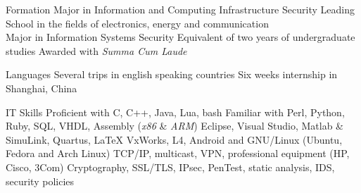 \begin{resume}

\supspacer


\begin{supitemize}{Formation}
		{Major in Information and Computing Infrastructure Security}
		{Leading School in the fields of electronics, energy and communication\\Major in Information Systems Security} %
		{Equivalent of two years of undergraduate studies}
		{Awarded with \emph{Summa Cum Laude}}
\end{supitemize}

\begin{supitemize}{Languages}
		{}
		{Several trips in english speaking countries}
		{}
		{Six weeks internship in Shanghai, China}
\end{supitemize}

\begin{supitemize}{IT Skills}
		{
			Proficient with C, C++, Java, Lua, bash\newline
			Familiar with Perl, Python, Ruby, SQL, VHDL, Assembly (\emph{x86} \& \emph{ARM})
		}
		{Eclipse, Visual Studio, Matlab \& SimuLink, Quartus, \LaTeX}
		{VxWorks, L4, Android and GNU/Linux (Ubuntu, Fedora and Arch Linux)}
		{TCP/IP, multicast, VPN, professional equipment (HP, Cisco, 3Com)}
		{Cryptography, SSL/TLS, IPsec, PenTest, static analysis, IDS, security policies}
\end{supitemize}


\end{resume}
